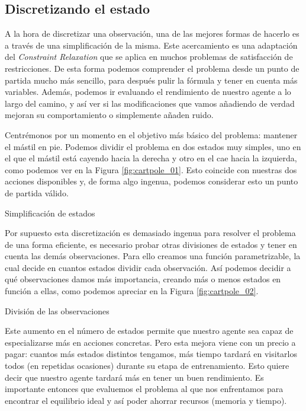 \subsection{Discretizando el estado}
A la hora de discretizar una observación, una de las mejores formas de hacerlo es a través de una simplificación de la misma. Este acercamiento es una adaptación del \textit{Constraint Relaxation} que se aplica en muchos problemas de satisfacción de restricciones. De esta forma podemos comprender el problema desde un punto de partida mucho más sencillo, para después pulir la fórmula y tener en cuenta más variables. Además, podemos ir evaluando el rendimiento de nuestro agente a lo largo del camino, y así ver si las modificaciones que vamos añadiendo de verdad mejoran su comportamiento o simplemente añaden ruido.

Centrémonos por un momento en el objetivo más básico del problema: mantener el mástil en pie. Podemos dividir el problema en dos estados muy simples, uno en el que el mástil está cayendo hacia la derecha y otro en el cae hacia la izquierda, como podemos ver en la Figura \ref{fig:cartpole_01}. Esto coincide con nuestras dos acciones disponibles y, de forma algo ingenua, podemos considerar esto un punto de partida válido.

%
       {Simplificación de estados}

Por supuesto esta discretización es demasiado ingenua para resolver el problema de una forma eficiente, es necesario probar otras divisiones de estados y tener en cuenta las demás observaciones. Para ello creamos una función parametrizable, la cual decide en cuantos estados dividir cada observación. Así podemos decidir a qué observaciones damos más importancia, creando más o menos estados en función a ellas, como podemos apreciar en la Figura \ref{fig:cartpole_02}.

%
       {División de las observaciones}

Este aumento en el número de estados permite que nuestro agente sea capaz de especializarse más en acciones concretas. Pero esta mejora viene con un precio a pagar: cuantos más estados distintos tengamos, más tiempo tardará en visitarlos todos (en repetidas ocasiones) durante su etapa de entrenamiento. Esto quiere decir que nuestro agente tardará más en tener un buen rendimiento. Es importante entonces que evaluemos el problema al que nos enfrentamos para encontrar el equilibrio ideal y así poder ahorrar recursos (memoria y tiempo).


